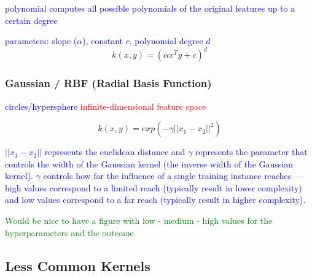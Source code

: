 \textcolor{blue}{polynomial computes all possible polynomials of the original features up to a certain degree}

\textcolor{blue}{parameters: slope ($\alpha$), constant $c$, polynomial degree $d$}
\begin{equation}
{k(x, y) = (\alpha x^T y + c)^d}
\label{eq:kernel_polynomial_eq}
\end{equation}

\subsubsection{Gaussian / RBF (Radial Basis Function)}

\textcolor{blue}{circles/hypersphere}
\textcolor{red}{infinite-dimensional feature space}

\begin{equation}
{k(x, y) = exp(- \gamma || x_1 - x_2 || ^2 ) }
\label{eq:kernel_guassian_rbf_eq}
\end{equation}

\textcolor{blue}{$|| x_1 - x_2 ||$ represents the euclidean distance and $\gamma$ represents the parameter that controls the width of the Gaussian kernel (the inverse width of the Gaussian kernel). $\gamma$ controls how far the influence of a single training instance reaches --- high values correspond to a limited reach (typically result in lower complexity) and low values correspond to a far reach (typically result in higher complexity).}

\textcolor{green}{Would be nice to have a figure with low - medium - high values for the hyperparameters and the outcome}


\subsection{Less Common Kernels}






